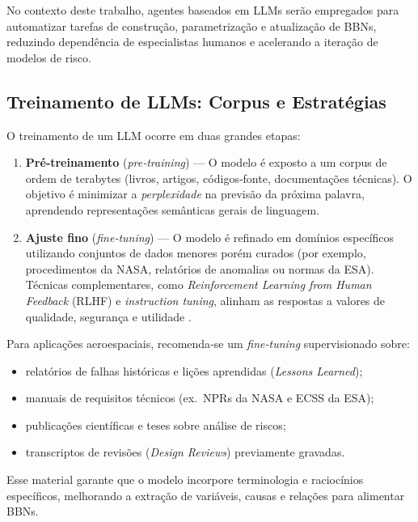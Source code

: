 No contexto deste trabalho, agentes baseados em LLMs serão empregados para automatizar tarefas de construção, parametrização e atualização de BBNs, reduzindo dependência de especialistas humanos e acelerando a iteração de modelos de risco.

\subsection{Treinamento de LLMs: Corpus e Estratégias}
\label{subsec:treino_llm}

O treinamento de um LLM ocorre em duas grandes etapas:

\begin{enumerate}
  \item \textbf{Pré‑treinamento} (\emph{pre‑training}) — O modelo é exposto a um corpus de ordem de terabytes (livros, artigos, códigos‑fonte, documentações técnicas). O objetivo é minimizar a \emph{perplexidade} na previsão da próxima palavra, aprendendo representações semânticas gerais de linguagem.
  
  \item \textbf{Ajuste fino} (\emph{fine‑tuning}) — O modelo é refinado em domínios específicos utilizando conjuntos de dados menores porém curados (por exemplo, procedimentos da NASA, relatórios de anomalias ou normas da ESA). Técnicas complementares, como \emph{Reinforcement Learning from Human Feedback} (RLHF) e \emph{instruction tuning}, alinham as respostas a valores de qualidade, segurança e utilidade \cite{ouyang2022training}.
\end{enumerate}

Para aplicações aeroespaciais, recomenda‑se um \emph{fine‑tuning} supervisionado sobre:

\begin{itemize}
  \item relatórios de falhas históricas e lições aprendidas (\emph{Lessons Learned});
  \item manuais de requisitos técnicos (ex.\ NPRs da NASA e ECSS da ESA);
  \item publicações científicas e teses sobre análise de riscos;
  \item transcriptos de revisões (\emph{Design Reviews}) previamente gravadas.
\end{itemize}

Esse material garante que o modelo incorpore terminologia e raciocínios específicos, melhorando a extração de variáveis, causas e relações para alimentar BBNs.




